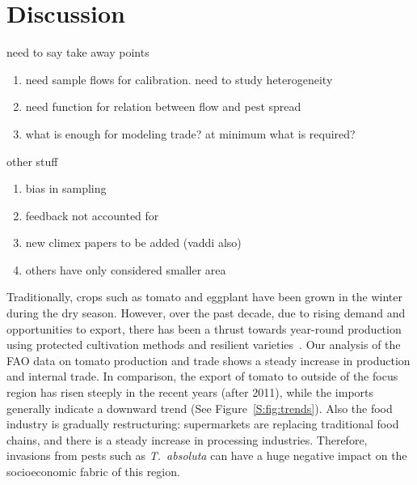 \documentclass[11pt]{article}
\newcommand{\tuta}{\emph{T.~absoluta}}
\theoremstyle{definition}
\begin{document}
\section{Discussion}

need to say take away points
\begin{enumerate}
    \item need sample flows for calibration. need to study heterogeneity
    \item need function for relation between flow and pest spread
    \item what is enough for modeling trade? at minimum what is
    required?
\end{enumerate}
other stuff
\begin{enumerate}
    \item bias in sampling
    \item feedback not accounted for
    \item new climex papers to be added (vaddi also)
    \item others have only considered smaller area
\end{enumerate}

Traditionally, crops such as tomato and eggplant have been grown in the
winter during the dry season. However, over the past decade, due to rising
demand and opportunities to export, there has been a thrust towards
year-round production using protected cultivation methods and resilient
varieties~\cite{ali2001}. Our analysis of the FAO data on
tomato production and trade shows a steady increase in production and
internal trade. In comparison, the export of tomato to outside of the focus
region has risen steeply in the recent years (after 2011), while the
imports generally indicate a downward trend (See
Figure~\ref{S:fig:trends}). Also the food industry is gradually
restructuring: supermarkets are replacing traditional food chains, and
there is a steady increase in processing industries. Therefore, invasions
from pests such as \tuta{} can have a huge negative impact on the
socioeconomic fabric of this region.
\end{document}
